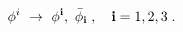 \begin{equation}\label{6}
  \phi^{i} \ \rightarrow \ \phi^{\bf{i}}, \ \bar\phi_{\bf{i}}\;, \quad {\bf{i}}=1,2,3\;.
\end{equation}


